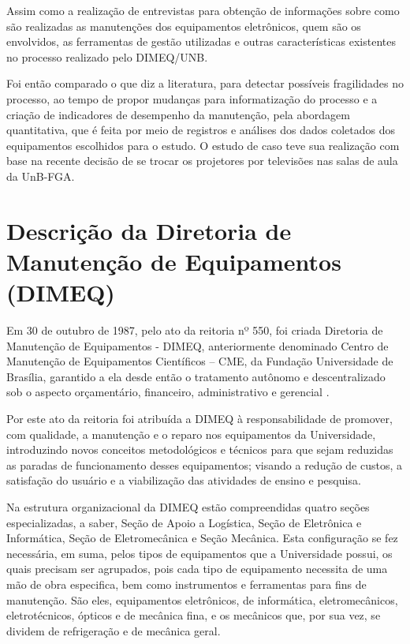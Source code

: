 Assim como a realização de entrevistas para obtenção de informações sobre como são realizadas as manutenções dos equipamentos eletrônicos, quem são os envolvidos, as ferramentas de gestão utilizadas e outras características existentes no processo realizado pelo DIMEQ/UNB.

Foi então comparado o que diz a literatura, para detectar possíveis fragilidades no processo, ao tempo de propor mudanças para informatização do processo e a criação de indicadores de desempenho da manutenção, pela abordagem quantitativa, que é feita por meio de registros e análises dos dados coletados dos equipamentos escolhidos para o estudo. O estudo de caso teve sua realização com base na recente decisão de se trocar os projetores por televisões nas salas de aula da UnB-FGA. 

\section{Descrição da Diretoria de Manutenção de Equipamentos (DIMEQ)}

Em 30 de outubro de 1987, pelo ato da reitoria nº 550, foi criada Diretoria de Manutenção de Equipamentos - DIMEQ, anteriormente denominado Centro de Manutenção de Equipamentos Científicos – CME, da Fundação Universidade de Brasília, garantido a ela desde então o tratamento autônomo e descentralizado sob o aspecto orçamentário, financeiro, administrativo e gerencial \cite{dimeq}.

Por este ato da reitoria foi atribuída a DIMEQ à responsabilidade de promover, com qualidade, a manutenção e o reparo nos equipamentos da Universidade, introduzindo novos conceitos metodológicos e técnicos para que sejam reduzidas as paradas de funcionamento desses equipamentos; visando a redução de custos, a satisfação do usuário e a viabilização das atividades de ensino e pesquisa.

Na estrutura organizacional da DIMEQ estão compreendidas quatro seções especializadas, a saber, Seção de Apoio a Logística, Seção de Eletrônica e Informática, Seção de Eletromecânica e Seção Mecânica. Esta configuração se fez necessária, em suma, pelos tipos de equipamentos que a Universidade possui, os quais precisam ser agrupados, pois cada tipo de equipamento necessita de uma mão de obra especifica, bem como instrumentos e ferramentas para fins de manutenção. São eles, equipamentos eletrônicos, de informática, eletromecânicos, eletrotécnicos, ópticos e de mecânica fina, e os mecânicos que, por sua vez, se dividem de refrigeração e de mecânica geral.

